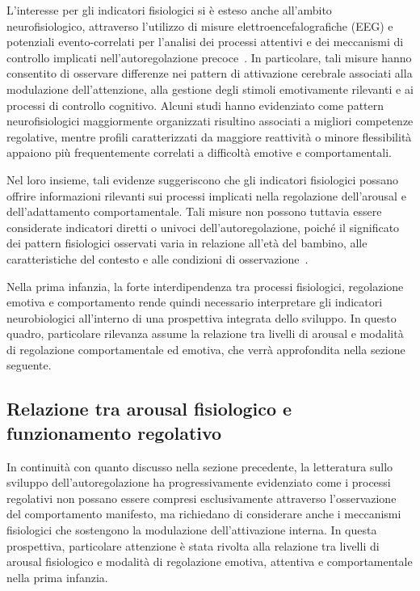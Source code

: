             L'interesse per gli indicatori fisiologici si è esteso anche all'ambito neurofisiologico, attraverso l'utilizzo di misure elettroencefalografiche (EEG) e potenziali evento-correlati per l'analisi dei processi attentivi e dei meccanismi di controllo implicati nell'autoregolazione precoce~\cite{fox1994,cuevas2014}. In particolare, tali misure hanno consentito di osservare differenze nei pattern di attivazione cerebrale associati alla modulazione dell'attenzione, alla gestione degli stimoli emotivamente rilevanti e ai processi di controllo cognitivo. Alcuni studi hanno evidenziato come pattern neurofisiologici maggiormente organizzati risultino associati a migliori competenze regolative, mentre profili caratterizzati da maggiore reattività o minore flessibilità appaiono più frequentemente correlati a difficoltà emotive e comportamentali.

            Nel loro insieme, tali evidenze suggeriscono che gli indicatori fisiologici possano offrire informazioni rilevanti sui processi implicati nella regolazione dell'arousal e dell'adattamento comportamentale. Tali misure non possono tuttavia essere considerate indicatori diretti o univoci dell'autoregolazione, poiché il significato dei pattern fisiologici osservati varia in relazione all'età del bambino, alle caratteristiche del contesto e alle condizioni di osservazione~\cite{cole2004,doebel2020}.

            Nella prima infanzia, la forte interdipendenza tra processi fisiologici, regolazione emotiva e comportamento rende quindi necessario interpretare gli indicatori neurobiologici all'interno di una prospettiva integrata dello sviluppo. In questo quadro, particolare rilevanza assume la relazione tra livelli di arousal e modalità di regolazione comportamentale ed emotiva, che verrà approfondita nella sezione seguente.

        \subsection{Relazione tra arousal fisiologico e funzionamento regolativo}
        \label{sec:3_3_3}

            In continuità con quanto discusso nella sezione precedente, la letteratura sullo sviluppo dell'autoregolazione ha progressivamente evidenziato come i processi regolativi non possano essere compresi esclusivamente attraverso l'osservazione del comportamento manifesto, ma richiedano di considerare anche i meccanismi fisiologici che sostengono la modulazione dell'attivazione interna. In questa prospettiva, particolare attenzione è stata rivolta alla relazione tra livelli di arousal fisiologico e modalità di regolazione emotiva, attentiva e comportamentale nella prima infanzia.

